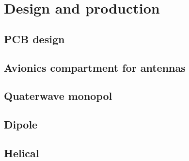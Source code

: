 \chapter{Design and production}
\section{PCB design}
\section{Avionics compartment for antennas}
\section{Quaterwave monopol}
\section{Dipole}
\section{Helical}
